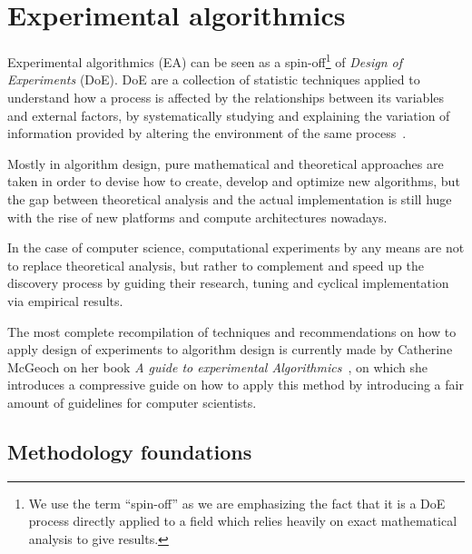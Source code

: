 \section{Experimental algorithmics}
Experimental algorithmics (EA) can be seen as a spin-off\footnote{We use the term ``spin-off'' as we are emphasizing the fact that it is a DoE process directly applied to a field which relies heavily on exact mathematical analysis to give results. } of \textit{Design of Experiments} (DoE). DoE are a collection of statistic techniques applied to understand how a process is affected by the relationships between its variables and external factors, by systematically studying and explaining the variation of information provided by altering the environment of the same process~\cite{Wagner_Mount_Giles_2014}.

Mostly in algorithm design, pure mathematical and theoretical approaches are taken in order to devise how to create, develop and optimize new algorithms, but the gap between theoretical analysis and the actual implementation is still huge with the rise of new platforms and compute architectures nowadays.

In the case of computer science, computational experiments by any means are not to replace theoretical analysis, but rather to complement and speed up the discovery process by guiding their research, tuning and cyclical implementation via empirical results.

The most complete recompilation of techniques and recommendations on how to apply design of experiments to algorithm design is currently made by Catherine McGeoch on her book \textit{A guide to experimental Algorithmics}~\cite{10.5555/2159557}, on which she introduces a compressive guide on how to apply this method by introducing a fair amount of guidelines for computer scientists.

\subsection{Methodology foundations}

